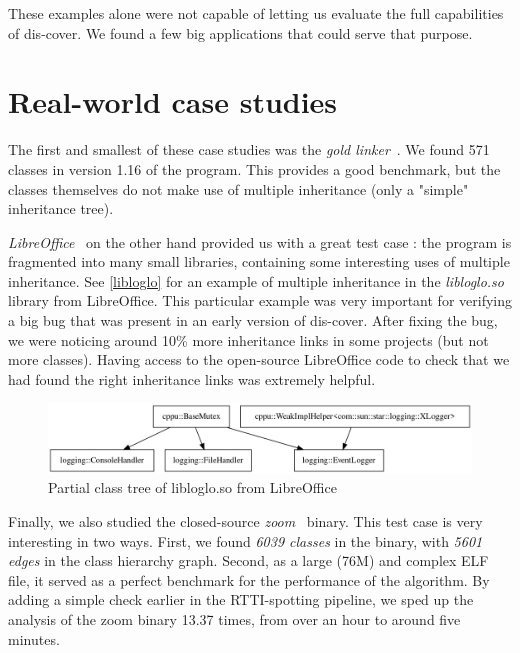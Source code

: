 \documentclass[a4paper,11pt,oneside]{report}
\begin{document}
These examples alone were not capable of letting us evaluate the full 
capabilities of dis-cover.
We found a few big applications that could serve that purpose.


\section{Real-world case studies}

The first and smallest of these case studies was the \emph{gold 
linker}~\cite{gold}.
We found 571 classes in version 1.16 of the program.
This provides a good benchmark, but the classes themselves do not make use of 
multiple inheritance (only a "simple" inheritance tree).

\emph{LibreOffice}~\cite{libreoffice} on the other hand provided us with a 
great test case :
the program is fragmented into many small libraries, containing some 
interesting uses of multiple inheritance.
See \autoref{libloglo} for an example of multiple inheritance in the 
\emph{libloglo.so} library from LibreOffice.
This particular example was very important for verifying a big bug that was 
present in an early version of dis-cover.
After fixing the bug, we were noticing around 10\% more inheritance links in 
some projects (but not more classes).
Having access to the open-source LibreOffice code to check that we had found 
the right inheritance links was extremely helpful.

\begin{figure}

\includegraphics[width=16cm]{libloglo_partial.png}
\caption{Partial class tree of libloglo.so from LibreOffice}
\label{libloglo}

\end{figure}

Finally, we also studied the closed-source \emph{zoom}~\cite{zoom} binary.
This test case is very interesting in two ways.
First, we found \emph{6039 classes} in the binary, with \emph{5601 edges}
in the class hierarchy graph.
Second, as a large (76M) and complex ELF file, it served as a perfect benchmark 
for the performance of the algorithm.
By adding a simple check earlier in the RTTI-spotting pipeline, we sped up the
analysis of the zoom binary 13.37 times, from over an hour to around five
minutes.
\end{document}
